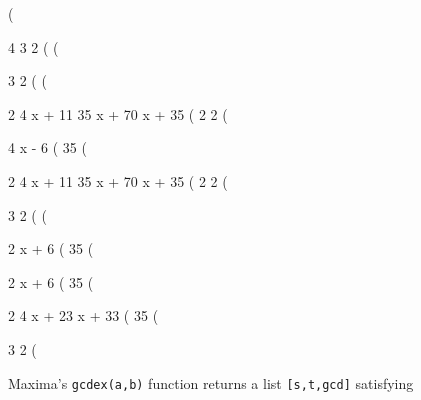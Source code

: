 \begin{computer-maxima}
(%

                           4       3       2
(%
(%

                                 3    2
(%
(%

                                                  2
                                   4 x + 11  35 x  + 70 x + 35
(%
                                      2              2
(%

                                            4 x - 6
(%
                                              35
(%

                                          2
                            4 x + 11  35 x  + 70 x + 35
(%
                               2              2
(%

                               3      2
(%
(%

                                    2 x + 6
(%
                                      35
(%

                                    2 x + 6
(%
                                      35
(%

                                   2
                                4 x  + 23 x + 33
(%
                                       35
(%

                               3      2
(%
\end{computer-maxima}

\vfill\eject


Maxima's {\tt gcdex(a,b)} function returns a list {\tt [s,t,gcd]} satisfying

